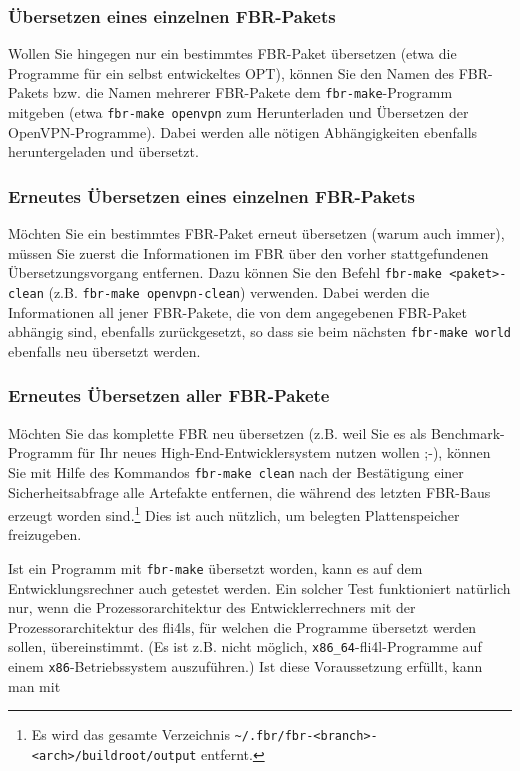 \subsubsection{Übersetzen eines einzelnen FBR-Pakets}

Wollen Sie hingegen nur ein bestimmtes FBR-Paket übersetzen (etwa die Programme
für ein selbst entwickeltes OPT), können Sie den Namen des FBR-Pakets bzw. die
Namen mehrerer FBR-Pakete dem \texttt{fbr-make}-Programm mitgeben (etwa
\texttt{fbr-make openvpn} zum Herunterladen und Übersetzen der
OpenVPN-Programme). Dabei werden alle nötigen Abhängigkeiten ebenfalls
heruntergeladen und übersetzt.

\subsubsection{Erneutes Übersetzen eines einzelnen FBR-Pakets}

Möchten Sie ein bestimmtes FBR-Paket erneut übersetzen (warum auch immer),
müssen Sie zuerst die Informationen im FBR über den vorher stattgefundenen
Übersetzungsvorgang entfernen. Dazu können Sie den Befehl
\texttt{fbr-make <paket>-clean} (z.B. \texttt{fbr-make openvpn-clean})
verwenden. Dabei werden die Informationen all jener FBR-Pakete, die von dem
angegebenen FBR-Paket abhängig sind, ebenfalls zurückgesetzt, so dass sie beim
nächsten \texttt{fbr-make world} ebenfalls neu übersetzt werden.

\subsubsection{Erneutes Übersetzen aller FBR-Pakete}

Möchten Sie das komplette FBR neu übersetzen (z.B. weil Sie es als
Benchmark-Programm für Ihr neues High-End-Entwicklersystem nutzen wollen ;-),
können Sie mit Hilfe des Kommandos \texttt{fbr-make clean} nach der Bestätigung
einer Sicherheitsabfrage alle Artefakte entfernen, die während des letzten
FBR-Baus erzeugt worden sind.\footnote{Es wird das gesamte Verzeichnis
\texttt{\~{}/.fbr/fbr-<branch>-<arch>/buildroot/output} entfernt.} Dies ist auch
nützlich, um belegten Plattenspeicher freizugeben.


Ist ein Programm mit \texttt{fbr-make} übersetzt worden, kann es auf dem
Entwicklungsrechner auch getestet werden. Ein solcher Test funktioniert
natürlich nur, wenn die Prozessorarchitektur des Entwicklerrechners mit der
Prozessorarchitektur des fli4ls, für welchen die Programme übersetzt werden
sollen, übereinstimmt. (Es ist z.B. nicht möglich,
\texttt{x86\_64}-fli4l-Programme auf einem \texttt{x86}-Betriebssystem
auszuführen.) Ist diese Voraussetzung erfüllt, kann man mit

